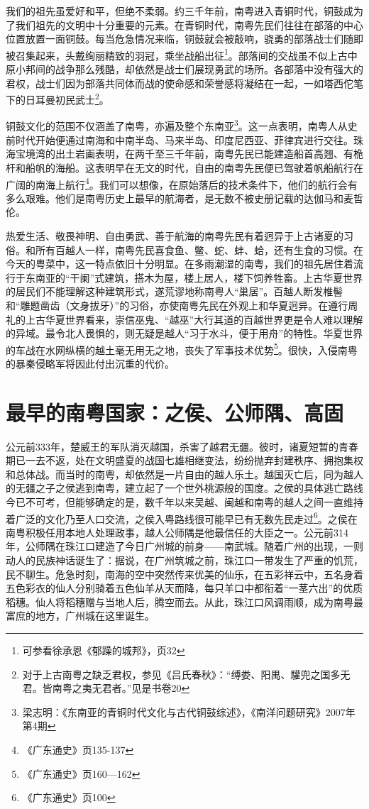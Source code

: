 我们的祖先虽爱好和平，但绝不柔弱。约三千年前，南粤进入青铜时代，铜鼓成为了我们祖先的文明中十分重要的元素。在青铜时代，南粤先民们往往在部落的中心位置放置一面铜鼓。每当危急情况来临，铜鼓就会被敲响，骁勇的部落战士们随即被召集起来，头戴绚丽精致的羽冠，乘坐战船出征\footnote{可参看徐承恩《郁躁的城邦》，页32}。部落间的交战虽不似上古中原小邦间的战争那么残酷，却依然是战士们展现勇武的场所。各部落中没有强大的君权，战士们因为部落共同体而战的使命感和荣誉感将凝结在一起，一如塔西佗笔下的日耳曼初民武士\footnote{对于上古南粤之缺乏君权，参见《吕氏春秋》：“缚娄、阳禺、驩兜之国多无君。皆南粤之夷无君者。”见是书卷20}。

铜鼓文化的范围不仅涵盖了南粤，亦遍及整个东南亚\footnote{梁志明：《东南亚的青铜时代文化与古代铜鼓综述》，《南洋问题研究》2007年第4期}。这一点表明，南粤人从史前时代开始便通过南海和中南半岛、马来半岛、印度尼西亚、菲律宾进行交往。珠海宝境湾的出土岩画表明，在两千至三千年前，南粤先民已能建造船首高翘、有桅杆和船帆的海船。这表明早在无文的时代，自由的南粤先民便已驾驶着帆船航行在广阔的南海上航行\footnote{《广东通史》页135-137}。我们可以想像，在原始落后的技术条件下，他们的航行会有多么艰难。他们是南粤历史上最早的航海者，是无数不被史册记载的达伽马和麦哲伦。

热爱生活、敬畏神明、自由勇武、善于航海的南粤先民有着迥异于上古诸夏的习俗。和所有百越人一样，南粤先民喜食鱼、鳖、蛇、蚌、蛤，还有生食的习惯。在今天的粤菜中，这一特点依旧十分明显。在多雨潮湿的南粤，我们的祖先居住着流行于东南亚的“干阑”式建筑，搭木为屋，楼上居人，楼下饲养牲畜。上古华夏世界的居民们不能理解这种建筑形式，遂荒谬地称南粤人“巢居”。百越人断发椎髻和“雕题凿齿（文身拔牙）”的习俗，亦使南粤先民在外观上和华夏迥异。在遵行周礼的上古华夏世界看来，崇信巫鬼、“越巫”大行其道的百越世界更是令人难以理解的异域。最令北人畏惧的，则无疑是越人“习于水斗，便于用舟”的特性。华夏世界的车战在水网纵横的越土毫无用无之地，丧失了军事技术优势\footnote{《广东通史》页160—162}。很快，入侵南粤的暴秦侵略军将因此付出沉重的代价。

\section{最早的南粤国家：之侯、公师隅、高固}

\indent 公元前333年，楚威王的军队消灭越国，杀害了越君无疆。彼时，诸夏短暂的青春期已一去不返，处在文明盛夏的战国七雄相继变法，纷纷抛弃封建秩序、拥抱集权和总体战。而当时的南粤，却依然是一片自由的越人乐土。越国灭亡后，同为越人的无疆之子之侯逃到南粤，建立起了一个世外桃源般的国度。之侯的具体逃亡路线今已不可考，但能够确定的是，数千年以来吴越、闽越和南粤的越人之间一直维持着广泛的文化乃至人口交流，之侯入粤路线很可能早已有无数先民走过\footnote{《广东通史》页100}。之侯在南粤积极任用本地人处理政事，越人公师隅是他最信任的大臣之一。公元前314年，公师隅在珠江口建造了今日广州城的前身——南武城。随着广州的出现，一则动人的民族神话诞生了：据说，在广州筑城之前，珠江口一带发生了严重的饥荒，民不聊生。危急时刻，南海的空中突然传来优美的仙乐，在五彩祥云中，五名身着五色彩衣的仙人分别骑着五色仙羊从天而降，每只羊口中都衔着“一茎六出”的优质稻穗。仙人将稻穗赠与当地人后，腾空而去。从此，珠江口风调雨顺，成为南粤最富庶的地方，广州城在这里诞生。


